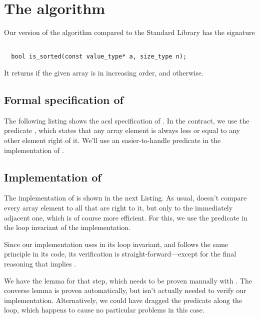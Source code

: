 
\section{The \issorted algorithm}

Our version of the \issorted algorithm compared to the \cxx Standard
Library \cite[\S 28.7.1.5]{cxx-17-draft} has the signature
\begin{lstlisting}[style = acsl-block]

  bool is_sorted(const value_type* a, size_type n);
\end{lstlisting}

It returns  if the given array is in increasing order, and
 otherwise.

\FloatBarrier

\subsection{Formal specification of \issorted}

The following listing shows the acsl specification of \issorted.
%
In the contract, we use the predicate ,
which states that any array element is always less or equal to any other element right of it.
%
We'll use an easier-to-handle predicate in the implementation of .



\clearpage

\subsection{Implementation of \issorted}

The implementation of \issorted is shown in the next Listing.
%
As usual, \issorted doesn't compare every array element to all that are right
to it, but only to the immediately adjacent one, which is of course
more efficient.
For this, we use the predicate 
in the loop invariant of the implementation.



Since our implementation uses \WeaklyIncreasing in its loop invariant, and
follows the same principle in its code, its verification is
straight-forward---except for the final reasoning that
 implies .

We have the lemma  for that step,
which needs to be proven manually with \coq.
%
The converse lemma 
is proven automatically, but isn't actually needed to verify our
\issorted implementation.
Alternatively, we could have dragged the predicate \Increasing along the
loop, which happens to cause no particular problems in this case.

\clearpage

